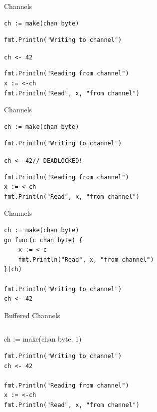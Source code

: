 \documentclass[pdf]{beamer}
\newcommand\z[1]{\texttt{#1}}
\newcommand\identifier[1]{{\color{green!70!black}\z{#1}}}
\begin{document}
\begin{frame}[fragile]{Channels}
\begin{lstlisting}
ch := make(chan byte)
\end{lstlisting}
\pause
\begin{lstlisting}
fmt.Println("Writing to channel")
\end{lstlisting}
\identifier{ch}\z{ <- 42}
\pause
\begin{lstlisting}
fmt.Println("Reading from channel")
x := <-ch
fmt.Println("Read", x, "from channel")
\end{lstlisting}
\end{frame}

\begin{frame}[fragile]{Channels}
\begin{lstlisting}
ch := make(chan byte)
\end{lstlisting}
\begin{lstlisting}
fmt.Println("Writing to channel")
\end{lstlisting}
{\color{red}\z{ch <- 42\qquad\qquad// DEADLOCKED!}}
\begin{lstlisting}
fmt.Println("Reading from channel")
x := <-ch
fmt.Println("Read", x, "from channel")
\end{lstlisting}
\end{frame}

\begin{frame}[fragile]{Channels}
\begin{lstlisting}
ch := make(chan byte)
go func(c chan byte) {
    x := <-c
    fmt.Println("Read", x, "from channel")
}(ch)

fmt.Println("Writing to channel")
ch <- 42
\end{lstlisting}
\end{frame}

\begin{frame}[fragile]{Buffered Channels}
\begin{lstlisting}
\end{lstlisting}
ch := make(chan byte, 1)
\pause
\begin{lstlisting}
fmt.Println("Writing to channel")
ch <- 42

fmt.Println("Reading from channel")
x := <-ch
fmt.Println("Read", x, "from channel")
\end{lstlisting}
\end{frame}

\subsection{}

%
\end{document}
